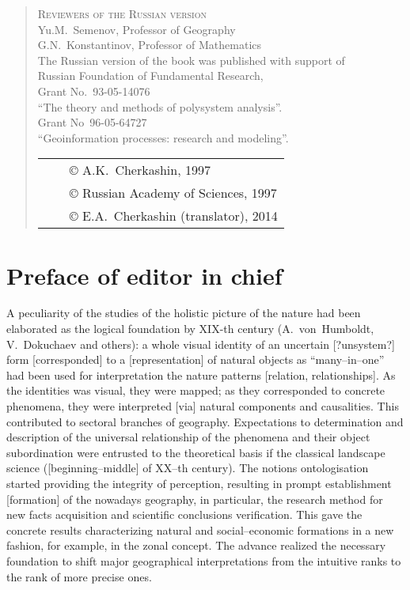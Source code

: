 \documentclass[12pt,leqno]{book}
\begin{document}
\begin{quote}
\begin{center}
\textsc{Reviewers of the Russian version}\\{}
Yu.M.~Semenov, Professor of Geography\\{}
G.N.~Konstantinov, Professor of Mathematics\\{}
\vspace{1em}
The Russian version of the book was published with support of\\{} Russian Foundation of Fundamental Research,\\{}
Grant No.~93-05-14076\\{}
``The theory and methods of polysystem analysis''.\\{}
Grant No~96-05-64727\\{}
``Geoinformation processes: research and modeling''.
\end{center}
\vfill{}
\begin{tabular}{lcl}
{}\hspace{0.4\linewidth}{} & & \copyright{} A.K.~Cherkashin, 1997\\
& & \copyright{} Russian Academy of Sciences, 1997\\
& & \copyright{} E.A.~Cherkashin (translator), 2014
\end{tabular}
\end{quote}

\tableofcontents

\chapter*{Preface of editor in chief}\normalsize
\pagestyle{plain}



A peculiarity of the studies of the holistic picture of the nature had been elaborated as the logical foundation by XIX-th century (A.~von~Humboldt, V.~Dokuchaev and others): a whole visual identity of an uncertain [?unsystem?] form [corresponded] to a [representation] of natural objects as ``many--in--one'' had been used for interpretation the nature patterns [relation, relationships]. As the identities was visual, they were mapped; as they corresponded to concrete phenomena, they were interpreted [via] natural components and causalities. This contributed to sectoral branches of geography. Expectations to determination and description of the universal relationship of the phenomena and their object subordination were entrusted to the theoretical basis if the classical landscape science ([beginning--middle] of XX--th century). The notions ontologisation started providing the integrity of perception, resulting in prompt establishment [formation] of the nowadays geography, in particular, the research method for new facts acquisition and scientific conclusions verification. This gave the concrete results characterizing natural and social--economic formations in a new fashion, for example, in the zonal concept. The advance realized the necessary foundation to shift major geographical interpretations from the intuitive ranks to the rank of more precise ones.
\end{document}
